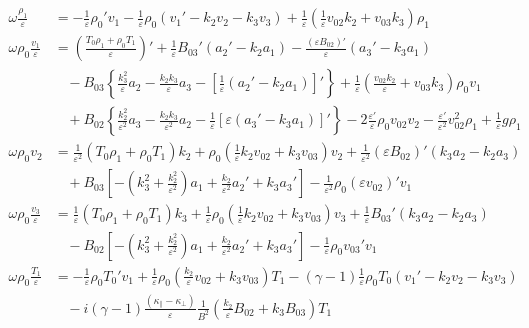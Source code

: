 \documentclass[11pt, fleqn]{article}
\newcommand{\eps}{\varepsilon}
\begin{document}
\begin{equation}
	\begin{aligned}
		\omega \frac{\rho_1}{\eps}			&= -\frac{1}{\eps}\rho_0'v_1 - \frac{1}{\eps}\rho_0\left(v_1' - k_2v_2 - k_3v_3\right) + \frac{1}{\eps}\left(\frac{1}{\eps}v_{02}k_2 + v_{03}k_3\right)\rho_1													\\[8pt]
		\omega \rho_0 \frac{v_1}{\eps}	&= \left(\frac{T_0\rho_1 + \rho_0 T_1}{\eps}\right)' + \frac{1}{\eps}B_{03}'\left(a_2' - k_2a_1\right) - \frac{(\eps B_{02})'}{\eps}\left(a_3' - k_3a_1\right)												\\
																		&~~~~ - B_{03}\left\{\frac{k_3^2}{\eps}a_2 - \frac{k_2k_3}{\eps}a_3 - \left[\frac{1}{\eps}\left(a_2' - k_2a_1\right)\right]'\right\} 
																					+ \frac{1}{\eps}\left(\frac{v_{02}k_2}{\eps} + v_{03}k_3\right)\rho_0v_1																																																				\\
																		&~~~~ + B_{02}\left\{\frac{k_2^2}{\eps^2}a_3 - \frac{k_2k_3}{\eps^2}a_2 - \frac{1}{\eps}\left[\eps\left(a_3' - k_3a_1\right)\right]'\right\} 
																					- 2\frac{\eps'}{\eps}\rho_0v_{02}v_2 - \frac{\eps'}{\eps^2}v_{02}^2\rho_1 + \frac{1}{\eps}g\rho_1																																								\\[8pt]
		\omega \rho_0 v_2								&= \frac{1}{\eps^2}(T_0\rho_1 + \rho_0T_1)k_2 + \rho_0\left(\frac{1}{\eps}k_2v_{02} + k_3v_{03}\right)v_2 + \frac{1}{\eps^2}(\eps B_{02})'\left(k_3a_2 - k_2a_3\right)								\\
																		&~~~~ + B_{03}\left[-\left(k_3^2 + \frac{k_2^2}{\eps^2}\right)a_1 + \frac{k_2}{\eps^2}a_2' + k_3a_3'\right] - \frac{1}{\eps^2}\rho_0(\eps v_{02})'v_1																	\\[8pt]
		\omega \rho_0 \frac{v_3}{\eps} 	&= \frac{1}{\eps}(T_0 \rho_1 + \rho_0 T_1)k_3 + \frac{1}{\eps}\rho_0\left(\frac{1}{\eps}k_2v_{02} + k_3v_{03}\right)v_3 + \frac{1}{\eps}B_{03}'\left(k_3a_2 - k_2a_3\right)						\\
																		&~~~~ - B_{02}\left[-\left(k_3^2 + \frac{k_2^2}{\eps^2}\right)a_1 + \frac{k_2}{\eps^2}a_2' + k_3a_3'\right] - \frac{1}{\eps}\rho_0v_{03}'v_1																					\\[8pt]
		\omega \rho_0 \frac{T_1}{\eps}	&= -\frac{1}{\eps}\rho_0T_0'v_1 + \frac{1}{\eps}\rho_0\left(\frac{k_2}{\eps}v_{02} + k_3v_{03}\right)T_1 - (\gamma - 1)\frac{1}{\eps}\rho_0T_0\left(v_1' - k_2v_2 - k_3v_3\right) 		\\
																		&~~~~ - i(\gamma - 1)\frac{(\kappa_\parallel - \kappa_\bot)}{\eps}\frac{1}{B^2}\left(\frac{k_2}{\eps}B_{02} + k_3B_{03}\right)T_1 

\end{aligned}
\end{equation}
\end{document}
